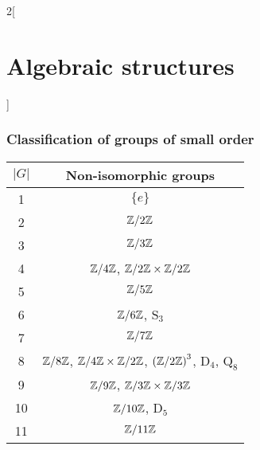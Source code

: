 \documentclass[../../../main_math.tex]{subfiles}
\begin{document}
\begin{multicols}{2}[\section{Algebraic structures}]
  \subsubsection{Classification of groups of small order}
  \begin{center}
    \begin{tabular}{|c|c|}
      \hline
      $|G|$ & Non-isomorphic groups                                                                                                       \\
      \hline
      1     & $\{e\}$                                                                                                                     \\
      \hline
      2     & $\quot{\ZZ}{2\ZZ}$                                                                                                          \\
      \hline
      3     & $\quot{\ZZ}{3\ZZ}$                                                                                                          \\
      \hline
      4     & $\quot{\ZZ}{4\ZZ}$, $\quot{\ZZ}{2\ZZ}\times\quot{\ZZ}{2\ZZ}$                                                                \\
      \hline
      5     & $\quot{\ZZ}{5\ZZ}$                                                                                                          \\
      \hline
      6     & $\quot{\ZZ}{6\ZZ}$, $\text{S}_3$                                                                                            \\
      \hline
      7     & $\quot{\ZZ}{7\ZZ}$                                                                                                          \\
      \hline
      8     & $\quot{\ZZ}{8\ZZ}$, $\quot{\ZZ}{4\ZZ}\times\quot{\ZZ}{2\ZZ}$, $\left(\quot{\ZZ}{2\ZZ}\right)^3$, $\text{D}_4$, $\text{Q}_8$ \\
      \hline
      9     & $\quot{\ZZ}{9\ZZ}$, $\quot{\ZZ}{3\ZZ}\times\quot{\ZZ}{3\ZZ}$                                                                \\
      \hline
      10    & $\quot{\ZZ}{10\ZZ}$, $\text{D}_5$                                                                                           \\
      \hline
      11    & $\quot{\ZZ}{11\ZZ}$                                                                                                         \\

\end{tabular}
\end{center}
\end{multicols}
\end{document}
